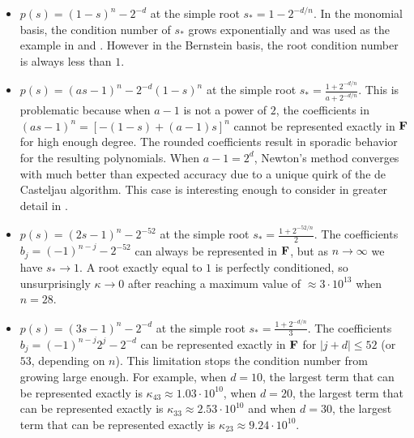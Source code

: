 \begin{itemize}
  \itemsep 0em
  \item \(p(s) = (1 - s)^n - 2^{-d}\) at the simple root
    \(s_{\ast} = 1 - 2^{-d/n}\). In the monomial basis, the
    condition number of \(s_{\ast}\) grows exponentially and was used
    as the example in \cite{Graillat2008} and \cite[Section~8]{Jiang2013}.
    However in the Bernstein basis, the root condition
    number is always less than \(1\).
  \item \(p(s) = (as - 1)^n - 2^{-d} (1 - s)^n\) at the simple root
    \(s_{\ast} = \frac{1 + 2^{-d/n}}{a + 2^{-d/n}}\). This is problematic
    because when \(a - 1\) is not a power of \(2\), the coefficients
    in \((as - 1)^n = \left[-(1 - s) + (a - 1)s\right]^n\) cannot be
    represented exactly in \(\mathbf{F}\) for high enough degree. The rounded
    coefficients result in sporadic behavior for the resulting polynomials.
    When \(a - 1 = 2^d\), Newton's method converges with much better than
    expected accuracy due to a unique quirk of the de Casteljau algorithm.
    This case is interesting enough to consider in greater detail
    in \cite{Hermes2018}.
  \item \(p(s) = (2s - 1)^n - 2^{-52}\) at the simple root
    \(s_{\ast} = \frac{1 + 2^{-52/n}}{2}\). The coefficients \(b_j =
    (-1)^{n - j} - 2^{-52}\) can always be represented in \(\mathbf{F}\),
    but as \(n \to \infty\) we have \(s_{\ast} \to 1\).
    A root exactly equal to \(1\) is perfectly conditioned, so
    unsurprisingly \(\kappa \to 0\) after reaching a maximum
    value of \(\approx 3 \cdot 10^{13}\) when \(n = 28\).
  \item \(p(s) = (3s - 1)^n - 2^{-d}\) at the simple root \(s_{\ast} = \frac{
    1 + 2^{-d/n}}{3}\). The coefficients \(b_j = (-1)^{n - j} 2^j - 2^{-d}\)
    can be represented exactly in \(\mathbf{F}\) for \(\left|j + d\right|
    \leq 52\) (or \(53\), depending on \(n\)). This limitation stops the
    condition number from growing large enough. For example, when \(d = 10\),
    the largest term that can be represented exactly is \(\kappa_{43}
    \approx 1.03 \cdot 10^{10}\),
    when \(d = 20\), the largest term that
    can be represented exactly is \(\kappa_{33} \approx 2.53 \cdot 10^{10}\)
    and when \(d = 30\), the largest term that
    can be represented exactly is \(\kappa_{23} \approx 9.24 \cdot 10^{10}\).
\end{itemize}

